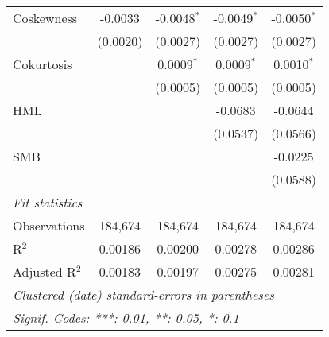 \begin{table}[H]
\begin{tabular}{lcccc}
      Coskewness     & -0.0033       & -0.0048$^{*}$ & -0.0049$^{*}$ & -0.0050$^{*}$\\   
                     & (0.0020)      & (0.0027)      & (0.0027)      & (0.0027)\\   
      Cokurtosis     &               & 0.0009$^{*}$  & 0.0009$^{*}$  & 0.0010$^{*}$\\   
                     &               & (0.0005)      & (0.0005)      & (0.0005)\\   
      HML            &               &               & -0.0683       & -0.0644\\   
                     &               &               & (0.0537)      & (0.0566)\\   
      SMB            &               &               &               & -0.0225\\   
                     &               &               &               & (0.0588)\\   
      \midrule
      \emph{Fit statistics}\\
      Observations   & 184,674       & 184,674       & 184,674       & 184,674\\  
      R$^2$          & 0.00186       & 0.00200       & 0.00278       & 0.00286\\  
      Adjusted R$^2$ & 0.00183       & 0.00197       & 0.00275       & 0.00281\\  
      \midrule \midrule
      \multicolumn{5}{l}{\emph{Clustered (date) standard-errors in parentheses}}\\
      \multicolumn{5}{l}{\emph{Signif. Codes: ***: 0.01, **: 0.05, *: 0.1}}\\
   \end{tabular}
\end{table}
